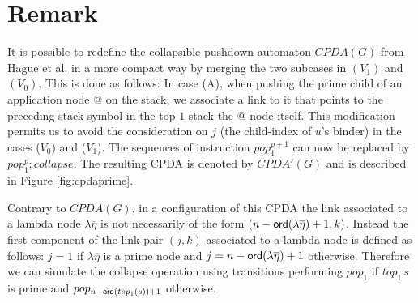 \documentclass[a4paper]{article}
\theoremstyle{remark}
\theoremstyle{definition}
\begin{document}
\section{Remark}
It is possible to redefine the collapsible pushdown automaton $CPDA(G)$ from Hague et al.
\cite{hmos-lics08} in a more compact way by merging the two subcases in
$(V_1)$ and $(V_0)$. This is done as follows: In case (A), when
pushing the prime child of an application node $@$ on the stack, we
associate a link to it that points to the preceding stack symbol in
the top $1$-stack \ie the $@$-node itself.
 This modification permits us to avoid the consideration on $j$ (the child-index of $u$'s binder) in the
 cases ($V_0$) and ($V_1$). The sequences of instruction $pop_1^{p+1}$ can now be replaced by
 $pop_1^p ; collapse$. The resulting CPDA is denoted by $CPDA'(G)$ and is described in
Figure \ref{fig:cpdaprime}.
\begin{figure}
\begin{center}
\end{center}
\end{figure}
Contrary to $CPDA(G)$, in a configuration of this CPDA the link associated to a lambda node $\lambda\overline\eta$ is not necessarily of the form
$(n-{\sf ord}(\lambda\overline\eta)+1,k)$. Instead the first component of the link pair $(j,k)$ associated to a lambda node is defined as follows:
$j = 1$ if $\lambda\overline\eta$ is a prime node and $j=n-{\sf ord}(\lambda\overline\eta)+1$ otherwise. Therefore we can simulate the collapse operation
using transitions performing $pop_1$ if $top_1\, s$ is prime and $pop_{n-{\sf ord}(top_1(s))+1}$ otherwise.




\end{document}
